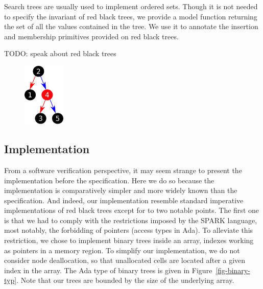 \documentclass[11pt,a4paper]{article}
\begin{document}
Search trees are usually used to implement ordered sets. Though it is not needed to
specify the invariant of red black trees, we provide a model function returning the
set of all the values contained in the tree. We use it to annotate the insertion and
membership primitives provided on red black trees.

{\color{red} TODO: speak about red black trees}

\begin{figure}[ht]
\begin{center}
\includegraphics[width=2cm]{red_black.pdf}
\end{center}
\end{figure}

\subsection{Implementation}

From a software verification perspective, it may seem strange to present the implementation
before the specification. Here we do so because the implementation is comparatively
simpler and more widely known than the specification. And indeed, our implementation
resemble standard imperative implementations of red black trees except for to two notable
points. The first one is that we had to comply with the restrictions imposed by the
SPARK language, most notably, the forbidding of pointers (access types in Ada). To
alleviate this restriction, we chose to implement binary trees inside an array, indexes
working as pointers in a memory region. To simplify our implementation, we do not consider
node deallocation, so that unallocated cells are located after a given index in the array.
The Ada type of binary trees is given in Figure~\ref{fig-binary-typ}.
Note that our trees are bounded by the size of the underlying array.
\end{document}
